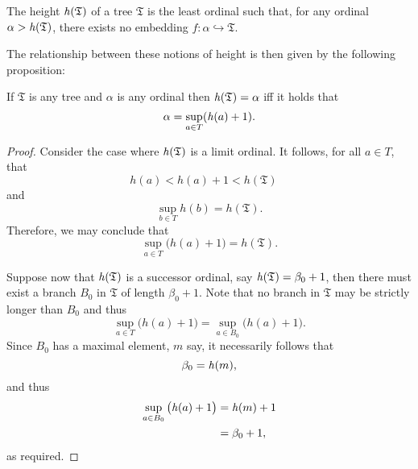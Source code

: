 \begin{dfn}
	The height $\mathit{h}(\mathfrak{T})$ of a tree $\mathfrak{T}$ is the least
	ordinal such that, for any ordinal $\alpha>\mathit{h}(\mathfrak{T})$, there exists
	no embedding $f\colon\alpha\hookrightarrow\mathfrak{T}$.
\end{dfn}

The relationship between these notions of height is then given by the following
proposition:

\begin{prp}
	If $\mathfrak{T}$ is any tree and $\alpha$ is any ordinal then
	$\mathit{h}(\mathfrak{T})=\alpha$ iff it holds that
	\begin{equation}
		\alpha=\sup_{a\in T}(\mathit{h}(a)+1).
	\end{equation}
\end{prp}
\begin{proof}
	Consider the case where $\mathit{h}(\mathfrak{T})$ is a limit ordinal.  It
	follows, for all $a\in T$, that
	\begin{equation}
		h(a)<h(a)+1<h(\mathfrak{T})\quad
	\end{equation}
	and
	\begin{equation}
		\sup_{b\in T}h(b)=h(\mathfrak{T}).
	\end{equation}
	Therefore, we may conclude that
	\begin{equation}
		\sup_{a\in T}\big(h(a)+1\big)=h(\mathfrak{T}).
	\end{equation}

	Suppose now that $\mathit{h}(\mathfrak{T})$ is a successor ordinal, say
	$\mathit{h}(\mathfrak{T})=\beta_{0}+1$, then there must exist a branch
	$B_{0}$ in $\mathfrak{T}$ of length $\beta_{0}+1$.  Note that no branch in
	$\mathfrak{T}$ may be strictly longer than $B_{0}$ and thus
	\begin{equation}
		\sup_{a\in T}\big(h(a)+1\big)=\sup_{a\in B_{0}}\big(h(a)+1\big).
	\end{equation}
	Since $B_{0}$ has a maximal element, $m$ say, it necessarily follows that
	\begin{equation}
		\beta_{0}=\mathit{h}(m),
	\end{equation}
	and thus
	\begin{align}
		\sup_{a\in B_{0}}\big(\mathit{h}(a)+1\big) & =\mathit{h}(m)+1 \\
		                                        & =\beta_{0}+1,
	\end{align}
	as required.
\end{proof}

